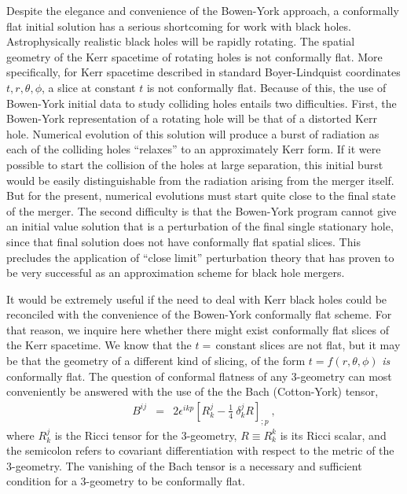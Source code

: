 Despite the elegance and convenience of the Bowen-York approach, a
conformally flat initial solution has a serious shortcoming for work
with black holes.  Astrophysically realistic black holes will be
rapidly rotating. The spatial geometry of the Kerr spacetime of
rotating holes is not conformally flat. More specifically, for Kerr
spacetime described in standard Boyer-Lindquist\cite{boyerlindquist}
coordinates $t,r,\theta,\phi$, a slice at constant $t$ is not
conformally flat.  Because of this, the use of Bowen-York initial data
to study colliding holes entails two difficulties. First, the
Bowen-York representation of a rotating hole will be that of a
distorted Kerr hole. Numerical evolution of this solution will produce
a burst of radiation as each of the colliding holes ``relaxes'' to an
approximately Kerr form\cite{singlespin}. If it were possible to start
the collision of the holes at large separation, this initial burst
would be easily distinguishable from the radiation arising from the
merger itself. But for the present, numerical evolutions must start quite
close to the final state of the merger.  The second difficulty is that
the Bowen-York program cannot give an initial value solution that is a
perturbation of the final single stationary hole, since that final
solution does not have conformally flat spatial slices. This precludes
the application of ``close limit'' perturbation theory that has proven
to be very successful as an approximation scheme for black hole
mergers\cite{closelimit}.

It would be extremely useful if the need to deal with Kerr black holes
could be reconciled with the convenience of the Bowen-York conformally
flat scheme. For that reason, we inquire here whether there might
exist conformally flat slices of the Kerr spacetime. We know that the
$t=$\,constant slices are not flat, but it may be that the geometry of
a different kind of slicing, of the form $t=f(r,\theta,\phi)$ {\em
is} conformally flat. The question of conformal flatness of any 3-geometry
can most conveniently be answered with the use of the 
the Bach (Cotton-York) tensor\cite{KSMH},
\begin{eqnarray}\label{Bachdef} 
B^{ij}&=& 2 \epsilon^{ikp}
[R^{j}_{k}-\frac{1}{4}\ \delta^{j}_{k}R]_{;p}\ ,
\end{eqnarray}
where $R^{j}_{k}$ is the Ricci tensor for the 3-geometry, $R\equiv
R^{k}_{k}$ is its Ricci scalar, and the semicolon refers to covariant
differentiation with respect to the metric of the 3-geometry. The
vanishing of the Bach tensor is a necessary and sufficient condition
for a 3-geometry to be conformally flat.



